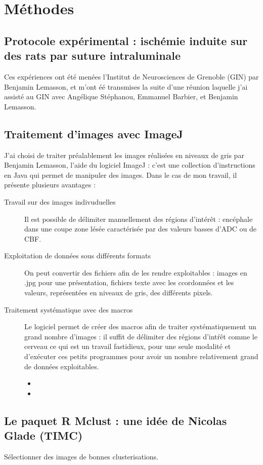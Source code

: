 \section{M\'ethodes}

\subsection{Protocole exp\'erimental : isch\'emie induite sur des rats par suture intraluminale}

Ces exp\'eriences ont \'et\'e men\'ees  l'Institut de Neurosciences de Grenoble (GIN) par Benjamin Lemasson, %
et m'ont \'e\'e transmises  la suite d'une r\'eunion  laquelle j'ai assist\'e au GIN %
avec Ang\'elique St\'ephanou, Emmanuel Barbier, et Benjamin Lemasson.


\subsection{Traitement d'images avec ImageJ}

J'ai choisi de traiter pr\'ealablement les images r\'ealis\'ees en niveaux de gris par Benjamin Lemasson,  l'aide du logiciel ImageJ : %
c'est une collection d'instructions en Java qui permet de manipuler des images. Dans le cas de mon travail, il pr\'esente plusieurs avantages :
\begin{description}
\item[Travail sur des images indivuduelles] Il est possible de d\'elimiter manuellement des r\'egions d'int\'er\^et : enc\'ephale dans une coupe %
zone l\'es\'ee caract\'eris\'ee par des valeurs basses d'ADC ou de CBF.
\item[Exploitation de donn\'ees sous diff\'erents formats] On peut convertir des fichiers afin de les rendre exploitables : %
images en .jpg pour une pr\'esentation, fichiers texte avec les ccordonn\'ees et les valeurs, repr\'esent\'ees en niveaux de gris, des diff\'erents pixels.
\item[Traitement syst\'ematique avec des macros] Le logiciel permet de cr\'eer des macros %
afin de traiter syst\'ematiquement un grand nombre d'images : il suffit de d\'elimiter des r\'egions d'int\'r\^et %
comme le cerveau %
ce qui est un travail fastidieux, pour une seule modalit\'e et d'ex\'ecuter ces petits programmes pour avoir un nombre relativement grand de donn\'ees exploitables.
\begin{itemize}
\item
\item 
\end{itemize}
\end{description}


\subsection{Le paquet R Mclust : une id\'ee de Nicolas Glade (TIMC)}%



S\'electionner des images de bonnes clusterisations.

\subsection{}%

